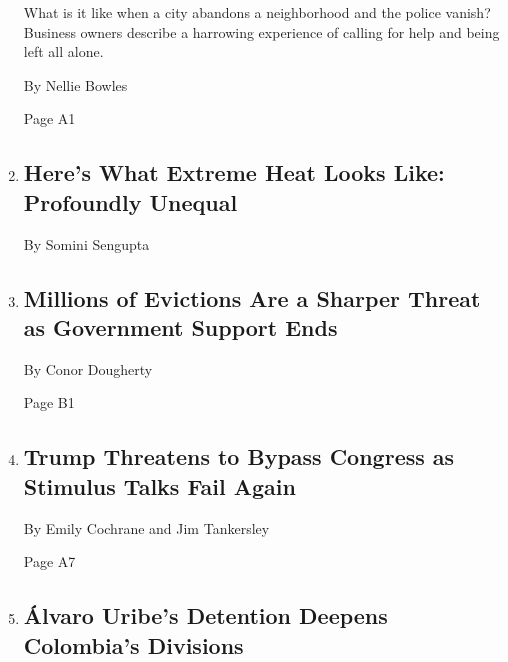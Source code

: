 \begin{enumerate}
  What is it like when a city abandons a neighborhood and the police
  vanish? Business owners describe a harrowing experience of calling for
  help and being left all alone.

  By Nellie Bowles

  Page A1
\item
  \href{/interactive/2020/08/06/climate/climate-change-inequality-heat.html}{}

  \hypertarget{heres-what-extreme-heat-looks-like-profoundly-unequal}{%
  \subsection{Here's What Extreme Heat Looks Like: Profoundly
  Unequal}\label{heres-what-extreme-heat-looks-like-profoundly-unequal}}

  By Somini Sengupta
\item
  \href{/2020/08/07/business/economy/housing-economy-eviction-renters.html}{}

  \hypertarget{millions-of-evictions-are-a-sharper-threat-as-government-support-ends}{%
  \subsection{Millions of Evictions Are a Sharper Threat as Government
  Support
  Ends}\label{millions-of-evictions-are-a-sharper-threat-as-government-support-ends}}

  By Conor Dougherty

  Page B1
\item
  \href{/2020/08/07/us/politics/trump-congress-stimulus.html}{}

  \hypertarget{trump-threatens-to-bypass-congress-as-stimulus-talks-fail-again}{%
  \subsection{Trump Threatens to Bypass Congress as Stimulus Talks Fail
  Again}\label{trump-threatens-to-bypass-congress-as-stimulus-talks-fail-again}}

  By Emily Cochrane and Jim Tankersley

  Page A7
\item
  \href{/2020/08/07/world/americas/uribe-colombia-house-arrest.html}{}

  \hypertarget{uxe1lvaro-uribes-detention-deepens-colombias-divisions}{%
  \subsection{Álvaro Uribe's Detention Deepens Colombia's
  Divisions}\label{uxe1lvaro-uribes-detention-deepens-colombias-divisions}}


\end{enumerate}
